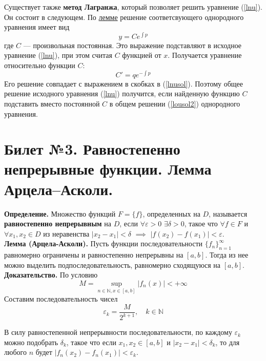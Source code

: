 \documentclass{article}
\begin{document}
Существует также \textbf{метод Лагранжа}, который позволяет решить уравнение (\ref{lnu}). Он состоит в следующем. По \hyperlink{loulemma}{лемме} решение соответсвующего однородного уравнения имеет вид
\begin{equation}
    y = Ce^{\int p} \label{lousol2}
\end{equation}
где $C$ --- произвольная постоянная. Это выражение подставляют в исходное уравнение (\ref{lnu}), при этом считая $C$ функцией от $x$. Получается уравнение относительно функции $C$:
\begin{equation*}
    C' = qe^{-\int p}
\end{equation*}
Его решение совпадает с выражением в скобках в (\ref{lnusol}). Поэтому общее решение исходного уравнения (\ref{lnu}) получится, если найденную функцию $C$ подставить вместо постоянной $C$ в общем решении (\ref{lousol2}) однородного уравнения.

\section{Билет №3. Равностепенно непрерывные функции. Лемма Арцела–Асколи.}
\textbf{Определение.} Множество функций $F = \{f\}$, определенных на $D$, называется \textbf{равностепенно непрерывным} на $D$, если $\forall \varepsilon > 0$ $\exists \delta > 0$, такое что $\forall f \in F$ и $\forall x_1, x_2 \in D$ из неравенства $|x_2 - x_1| < \delta$ $\implies$ $|f(x_2) - f(x_1)| < \varepsilon$.\\

\noindent \textbf{Лемма (Арцела-Асколи).} Пусть функции последовательности $\{f_n\}_{n=1}^{\infty}$ равномерно ограничены и равностепенно непрерывны на $[a,b]$. Тогда из нее можно выделить подпоследовательность, равномерно сходящуюся на $[a,b]$.\\
\noindent \textbf{Доказательство.} По условию
\begin{equation*}
    M = \sup_{n \in \mathbb{N}, x \in [a,b]} |f_n(x)| < +\infty
\end{equation*}
Составим последовательность чисел
\begin{equation*}
    \varepsilon_k = \frac{M}{2^{k+1}}, \quad k \in \mathbb{N}
\end{equation*}

В силу равностепенной непрерывности последовательности, по каждому $\varepsilon_k$ можно подобрать $\delta_k$, такое что если $x_1, x_2 \in [a,b]$ и $|x_2 - x_1| < \delta_k$, то для любого $n$ будет $|f_n(x_2) - f_n(x_1)| < \varepsilon_k$.
\end{document}
